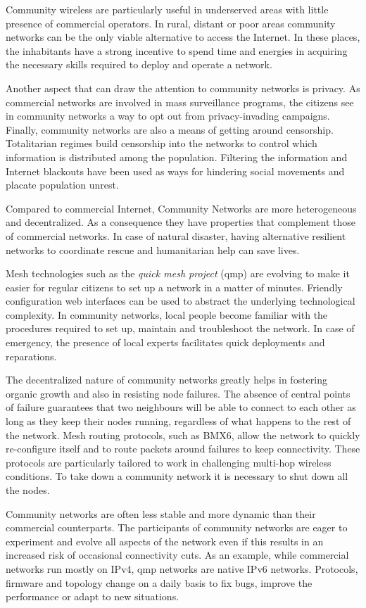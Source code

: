 \documentclass[journal]{IEEEtran}
\begin{document}
Community wireless are particularly useful in underserved areas with little presence of commercial operators.
In rural, distant or poor areas community networks can be the only viable alternative to access the Internet.
In these places, the inhabitants have a strong incentive to spend time and energies in acquiring the necessary skills required to deploy and operate a network.

Another aspect that can draw the attention to community networks is privacy.
As commercial networks are involved in mass surveillance programs, the citizens see in community networks a way to opt out from privacy-invading campaigns.
Finally, community networks are also a means of getting around censorship.
Totalitarian regimes build censorship into the networks to control which information is distributed among the population.
Filtering the information and Internet blackouts have been used as ways for hindering social movements and placate population unrest. 

Compared to commercial Internet, Community Networks are more heterogeneous and decentralized.
As a consequence they have properties that complement those of commercial networks.
In case of natural disaster, having alternative resilient networks to coordinate rescue and humanitarian help can save lives.

Mesh technologies such as the \emph{quick mesh project} (qmp) are evolving to make it easier for regular citizens to set up a network in a matter of minutes.
Friendly configuration web interfaces can be used to abstract the underlying technological complexity.
In community networks, local people become familiar with the procedures required to set up, maintain and troubleshoot the network.
In case of emergency, the presence of local experts facilitates quick deployments and reparations. 

The decentralized nature of community networks greatly helps in fostering organic growth and also in  resisting node failures.
The absence of central points of failure guarantees that two neighbours will be able to connect to each other as long as they keep their nodes running, regardless of what happens to the rest of the network.
Mesh routing protocols, such as BMX6, allow the network to quickly re-configure itself and to route packets around failures to keep connectivity.
These protocols are particularly tailored to work in challenging multi-hop wireless conditions.
To take down a community network it is necessary to shut down all the nodes.

Community networks are often less stable and more dynamic than their commercial counterparts.
The participants of community networks are eager to experiment and evolve all aspects of the network even if this results in an increased risk of occasional connectivity cuts.
As an example, while commercial networks run mostly on IPv4, qmp networks are native IPv6 networks.
Protocols, firmware and topology change on a daily basis to fix bugs, improve the performance or adapt to new situations.
\end{document}
